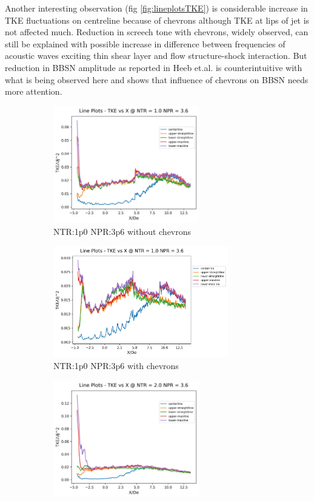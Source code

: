 Another interesting observation (fig \ref{fig:lineplotsTKE}) is considerable increase in TKE fluctuations on centreline because of chevrons although TKE at lips of jet is not affected much. Reduction in screech tone with chevrons, widely observed, can still be explained with possible increase in difference between frequencies of acoustic waves exciting thin shear layer and flow structure-shock interaction. But reduction in BBSN amplitude as reported in Heeb et.al.\cite{heeb} is counterintuitive with what is being observed here and shows that influence of chevrons on BBSN needs more attention. 

\begin{figure}[H]
\begin{subfigure}{.5\textwidth}
	\centering
	\includegraphics[width=2.5in]{images/LinePlots_TKE_NTR1p0_NPR3p6.png}
	\caption{NTR:1p0 NPR:3p6 without chevrons }
	\label{fig:setup1}
\end{subfigure}%
\begin{subfigure}{.5\textwidth}
	\centering
	\includegraphics[width=3in]{images/LinePlots_TKE_NTR1p0_NPR3p6c.png}
	\caption{NTR:1p0 NPR:3p6 with chevrons}
	\label{fig:setup2}
\end{subfigure}
\begin{subfigure}{.5\textwidth}
	\centering
	\includegraphics[width=2.5in]{images/LinePlots_TKE_NTR2p0_NPR3p6.png}

\end{subfigure}
\end{figure}

